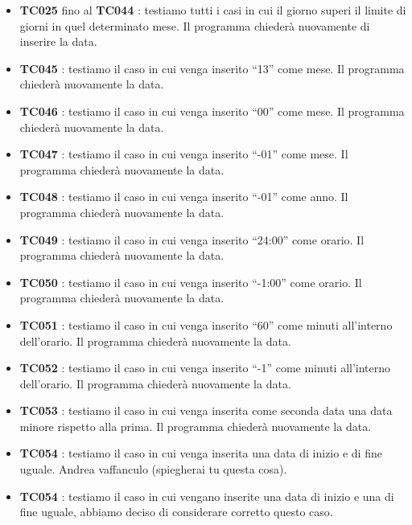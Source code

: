 \documentclass[11pt]{scrartcl} %
\begin{document}
\begin{itemize}
	\item \textbf{TC025} fino al \textbf{TC044} : testiamo tutti i casi in cui il giorno superi il limite di giorni in quel determinato mese. Il programma chiederà nuovamente di inserire la data.

	\item \textbf{TC045} : testiamo il caso in cui venga inserito “13” come mese. Il programma chiederà nuovamente la data.

	\item \textbf{TC046} : testiamo il caso in cui venga inserito “00” come mese. Il programma chiederà nuovamente la data.

	\item \textbf{TC047} : testiamo il caso in cui venga inserito “-01” come mese. Il programma chiederà nuovamente la data.

	\item \textbf{TC048} : testiamo il caso in cui venga inserito “-01” come anno. Il programma chiederà nuovamente la data.

	\item \textbf{TC049} : testiamo il caso in cui venga inserito “24:00” come orario. Il programma chiederà nuovamente la data.

	\item \textbf{TC050} : testiamo il caso in cui venga inserito “-1:00” come orario. Il programma chiederà nuovamente la data.

	\item \textbf{TC051} : testiamo il caso in cui venga inserito “60” come minuti all’interno dell’orario. Il programma chiederà nuovamente la data.

	\item \textbf{TC052} : testiamo il caso in cui venga inserito “-1” come minuti all’interno dell’orario. Il programma chiederà nuovamente la data.

	\item \textbf{TC053} : testiamo il caso in cui venga inserita come seconda data una data minore rispetto alla prima. Il programma chiederà nuovamente la data.

	\item \textbf{TC054} : testiamo il caso in cui venga inserita una data di inizio e di fine uguale. Andrea vaffanculo (spiegherai tu questa cosa).

	\item \textbf{TC054} : testiamo il caso in cui vengano inserite una data di inizio e una di fine uguale, abbiamo deciso di considerare corretto questo caso.

\end{itemize}
\end{document}
